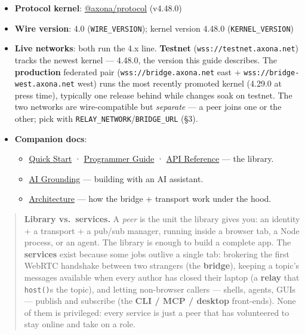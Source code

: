 \documentclass[
  nobib]{tufte-handout}
\providecommand{\tightlist}{%
  \setlength{\itemsep}{0pt}\setlength{\parskip}{0pt}}
\begin{document}
\begin{itemize}
\tightlist
\item
  \textbf{Protocol kernel}:
  \href{https://github.com/axona-net/axona-protocol}{@axona/protocol}
  (v4.48.0)
\item
  \textbf{Wire version}: 4.0 (\texttt{WIRE\_VERSION}); kernel version
  4.48.0 (\texttt{KERNEL\_VERSION})
\item
  \textbf{Live networks}: both run the 4.x line. \textbf{Testnet}
  (\texttt{wss://testnet.axona.net}) tracks the newest kernel ---
  4.48.0, the version this guide describes. The \textbf{production}
  federated pair (\texttt{wss://bridge.axona.net} east +
  \texttt{wss://bridge-west.axona.net} west) runs the most recently
  promoted kernel (4.29.0 at press time), typically one release behind
  while changes soak on testnet. The two networks are wire-compatible
  but \emph{separate} --- a peer joins one or the other; pick with
  \texttt{RELAY\_NETWORK}/\texttt{BRIDGE\_URL} (§3).
\item
  \textbf{Companion docs}:

  \begin{itemize}
  \tightlist
  \item
    \href{Quick-Start-v4.48.0.md}{Quick Start} ·
    \href{Axona-Programmer-Guide-v4.48.0.md}{Programmer Guide} ·
    \href{Axona-API-Reference-v4.48.0.md}{API Reference} --- the
    library.
  \item
    \href{Axona-AI-Grounding-v4.30.0.md}{AI Grounding} --- building with
    an AI assistant.
  \item
    \href{../architecture/Axona-Architecture.tex}{Architecture} --- how
    the bridge + transport work under the hood.
  \end{itemize}
\end{itemize}

\begin{quote}
\textbf{Library vs.~services.} A \emph{peer} is the unit the library
gives you: an identity + a transport + a pub/sub manager, running inside
a browser tab, a Node process, or an agent. The library is enough to
build a complete app. The \textbf{services} exist because some jobs
outlive a single tab: brokering the first WebRTC handshake between two
strangers (the \textbf{bridge}), keeping a topic's messages available
when every author has closed their laptop (a \textbf{relay} that
\texttt{host()}s the topic), and letting non-browser callers --- shells,
agents, GUIs --- publish and subscribe (the \textbf{CLI / MCP / desktop}
front-ends). None of them is privileged: every service is just a peer
that has volunteered to stay online and take on a role.
\end{quote}
\end{document}
